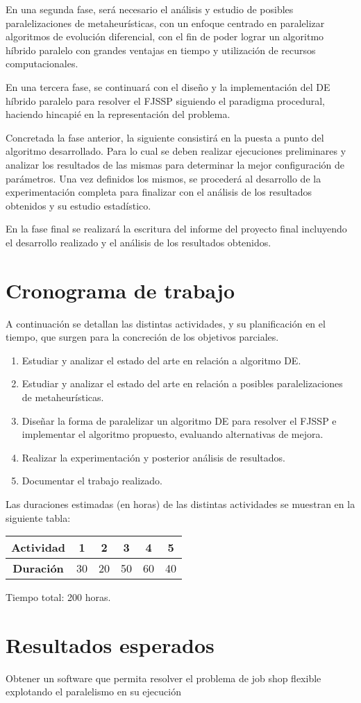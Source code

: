 En una segunda fase, será necesario el análisis y estudio de posibles paralelizaciones de metaheurísticas, con un enfoque centrado en paralelizar algoritmos de evolución diferencial, con el fin de poder lograr un algoritmo híbrido paralelo con grandes ventajas en tiempo y utilización de recursos computacionales.


En una tercera fase, se continuará con el diseño y la implementación del DE híbrido paralelo para resolver el FJSSP siguiendo el paradigma procedural, haciendo hincapié en la representación del problema. 
 

Concretada la fase anterior, la siguiente consistirá en la puesta a punto del algoritmo desarrollado. Para lo cual se deben realizar ejecuciones preliminares y analizar los resultados de las mismas para determinar la mejor configuración de parámetros. Una vez definidos los mismos, se procederá al desarrollo de la experimentación completa para finalizar con el análisis de los resultados obtenidos y su estudio estadístico.


En la fase final se realizará la escritura del informe del proyecto final incluyendo el desarrollo realizado y el análisis de los resultados obtenidos.


\section{Cronograma de trabajo}
A continuación se detallan las distintas actividades, y su planificación en el tiempo, que surgen para la concreción de los objetivos parciales.

\begin{enumerate}
    \item Estudiar y analizar el estado del arte en relación a algoritmo DE.
    \item Estudiar y analizar el estado del arte en relación a posibles paralelizaciones de
metaheurísticas.
    \item Diseñar la forma de paralelizar un algoritmo DE para resolver el FJSSP e implementar el algoritmo propuesto, evaluando alternativas de mejora.
    \item Realizar la experimentación y posterior análisis de resultados.
    \item Documentar el trabajo realizado.
\end{enumerate}

Las duraciones estimadas (en horas) de las distintas actividades se muestran en la siguiente tabla:

\begin{table}[h]
\centering
\begin{tabular}{|c|c|c|c|c|c|}
\hline
\textbf{Actividad} & \textbf{1} & \textbf{2} & \textbf{3} & \textbf{4} & \textbf{5} \\ \hline
\textbf{Duración}  & 30         & 20         & 50         & 60         & 40         \\ \hline
\end{tabular}
\end{table}

Tiempo total: 200 horas.


\section{Resultados esperados}
Obtener un software que permita resolver el problema de job shop flexible explotando el paralelismo en su ejecución 
